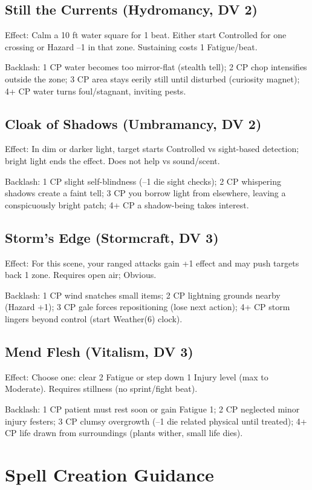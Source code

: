 \subsection{Still the Currents (Hydromancy, DV 2)}
Effect: Calm a 10 ft water square for 1 beat. Either start Controlled for one crossing or Hazard --1 in that zone. Sustaining costs 1 Fatigue/beat.

Backlash: 1 CP water becomes too mirror-flat (stealth tell); 2 CP chop intensifies outside the zone; 3 CP area stays eerily still until disturbed (curiosity magnet); 4+ CP water turns foul/stagnant, inviting pests.

\subsection{Cloak of Shadows (Umbramancy, DV 2)}
Effect: In dim or darker light, target starts Controlled vs sight-based detection; bright light ends the effect. Does not help vs sound/scent.

Backlash: 1 CP slight self-blindness (--1 die sight checks); 2 CP whispering shadows create a faint tell; 3 CP you borrow light from elsewhere, leaving a conspicuously bright patch; 4+ CP a shadow-being takes interest.

\subsection{Storm's Edge (Stormcraft, DV 3)}
Effect: For this scene, your ranged attacks gain +1 effect and may push targets back 1 zone. Requires open air; Obvious.

Backlash: 1 CP wind snatches small items; 2 CP lightning grounds nearby (Hazard +1); 3 CP gale forces repositioning (lose next action); 4+ CP storm lingers beyond control (start Weather(6) clock).

\subsection{Mend Flesh (Vitalism, DV 3)}
Effect: Choose one: clear 2 Fatigue or step down 1 Injury level (max to Moderate). Requires stillness (no sprint/fight beat).

Backlash: 1 CP patient must rest soon or gain Fatigue 1; 2 CP neglected minor injury festers; 3 CP clumsy overgrowth (--1 die related physical until treated); 4+ CP life drawn from surroundings (plants wither, small life dies).

\section{Spell Creation Guidance}

